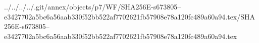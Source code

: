../../../../.git/annex/objects/p7/WF/SHA256E-s673805--e3427702a5bc6a56aab330f52bb522af7702621fb57908e78a120fc489a60a94.tex/SHA256E-s673805--e3427702a5bc6a56aab330f52bb522af7702621fb57908e78a120fc489a60a94.tex